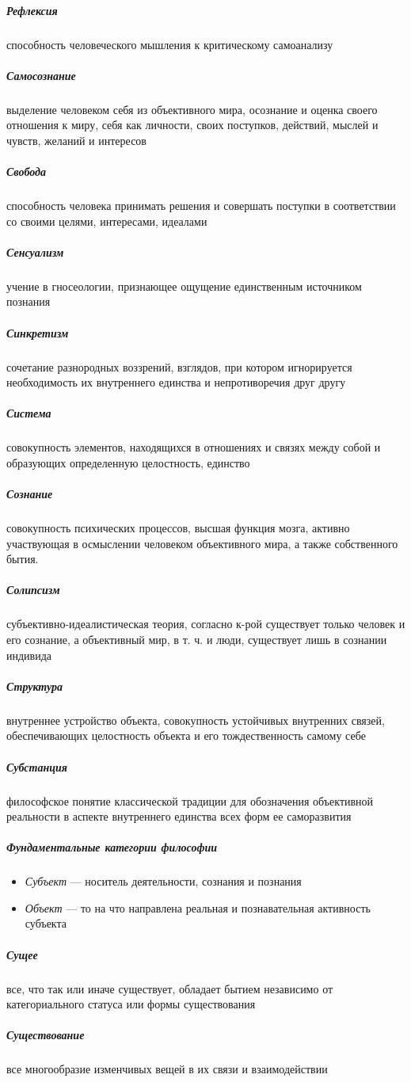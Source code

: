 \documentclass[a4paper, 12pt]{article}
\theoremstyle{plain} %
\theoremstyle{definition} %
\theoremstyle{remark} %
\begin{document}
\subparagraph{Рефлексия}
	 способность человеческого мышления к критическому самоанализу

\subparagraph{Самосознание}
	выделение человеком себя из объективного мира, осознание и оценка своего отношения к миру, себя как личности, своих поступков, действий, мыслей и чувств, желаний и интересов

\subparagraph{Свобода}
	 способность человека принимать решения и совершать поступки в соответствии со своими целями, интересами, идеалами

\subparagraph{Сенсуализм}
	 учение в гносеологии, признающее ощущение единственным источником познания

\subparagraph{Синкретизм}
	сочетание разнородных воззрений, взглядов, при котором игнорируется необходимость их внутреннего единства и непротиворечия друг другу

\subparagraph{Система}
	совокупность элементов, находящихся в отношениях и связях между собой и образующих определенную целостность, единство

\subparagraph{Сознание}
	совокупность психических процессов, высшая функция мозга, активно участвующая в осмыслении человеком объективного мира, а также собственного бытия.

\subparagraph{Солипсизм}
	субъективно-идеалистическая теория, согласно к-рой существует только человек и его сознание, а объективный мир, в т. ч. и люди, существует лишь в сознании индивида

\subparagraph{Структура}
	внутреннее устройство объекта, совокупность устойчивых внутренних связей, обеспечивающих целостность объекта и его тождественность самому себе

\subparagraph{Субстанция}
	философское понятие классической традиции для обозначения объективной реальности в аспекте внутреннего единства всех форм ее саморазвития

\subparagraph{Фундаментальные категории философии}
\begin{itemize}
	\item[] \emph{Субъект} --- носитель деятельности, сознания и познания
	\item[] \emph{Объект} --- то на что направлена реальная и познавательная активность субъекта
\end{itemize}

\subparagraph{Сущее}
	все, что так или иначе существует, обладает бытием независимо от категориального статуса или формы существования

\subparagraph{Существование}
	все многообразие изменчивых вещей в их связи и взаимодействии
\end{document}
